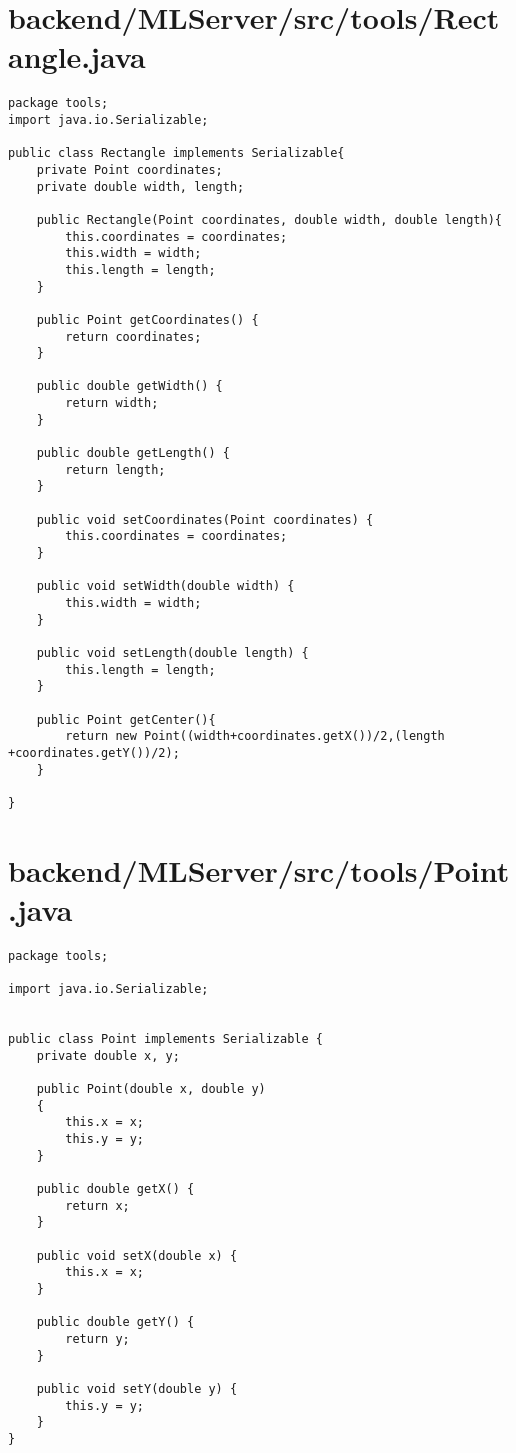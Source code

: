 \section{backend/MLServer/src/tools/Rectangle.java}
\begin{lstlisting}package tools;
import java.io.Serializable;

public class Rectangle implements Serializable{
    private Point coordinates;
    private double width, length;

    public Rectangle(Point coordinates, double width, double length){
        this.coordinates = coordinates;
        this.width = width;
        this.length = length;
    }

    public Point getCoordinates() {
        return coordinates;
    }

    public double getWidth() {
        return width;
    }

    public double getLength() {
        return length;
    }

    public void setCoordinates(Point coordinates) {
        this.coordinates = coordinates;
    }

    public void setWidth(double width) {
        this.width = width;
    }

    public void setLength(double length) {
        this.length = length;
    }

    public Point getCenter(){
        return new Point((width+coordinates.getX())/2,(length +coordinates.getY())/2);
    }

}
\end{lstlisting}
\newpage
\section{backend/MLServer/src/tools/Point.java}
\begin{lstlisting}package tools;

import java.io.Serializable;


public class Point implements Serializable {
    private double x, y;

    public Point(double x, double y)
    {
        this.x = x;
        this.y = y;
    }

    public double getX() {
        return x;
    }

    public void setX(double x) {
        this.x = x;
    }

    public double getY() {
        return y;
    }

    public void setY(double y) {
        this.y = y;
    }
}
\end{lstlisting}
\newpage
